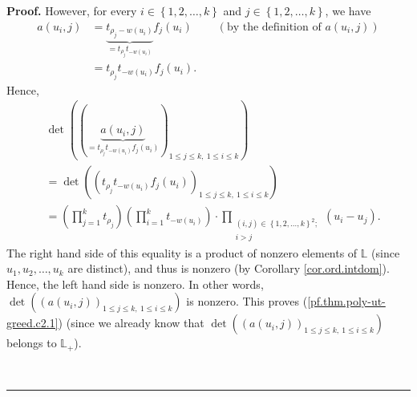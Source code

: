 \documentclass[numbers=enddot,12pt,final,onecolumn,notitlepage]{scrartcl}%
\theoremstyle{definition}
\newenvironment{proof}[1][Proof]{\noindent\textbf{#1.} }{\ \rule{0.5em}{0.5em}}
\let\prodnonlimits\prod
\renewcommand{\prod}{\prodnonlimits\limits}
\renewcommand{\leq}{\leqslant}
\theoremstyle{plainsl}
\begin{document}
\begin{proof}
However, for every $i\in\left\{  1,2,\ldots,k\right\}  $ and $j\in\left\{
1,2,\ldots,k\right\}  $, we have%
\begin{align*}
a\left(  u_{i},j\right)   &  =\underbrace{t_{\rho_{j}-w\left(  u_{i}\right)
}}_{=t_{\rho_{j}}t_{-w\left(  u_{i}\right)  }}f_{j}\left(  u_{i}\right)
\ \ \ \ \ \ \ \ \ \ \left(  \text{by the definition of }a\left(
u_{i},j\right)  \right) \\
&  =t_{\rho_{j}}t_{-w\left(  u_{i}\right)  }f_{j}\left(  u_{i}\right)  .
\end{align*}
Hence,%
\begin{align}
&  \det\left(  \left(  \underbrace{a\left(  u_{i},j\right)  }_{=t_{\rho_{j}%
}t_{-w\left(  u_{i}\right)  }f_{j}\left(  u_{i}\right)  }\right)  _{1\leq
j\leq k,\ 1\leq i\leq k}\right) \nonumber\\
&  =\det\left(  \left(  t_{\rho_{j}}t_{-w\left(  u_{i}\right)  }f_{j}\left(
u_{i}\right)  \right)  _{1\leq j\leq k,\ 1\leq i\leq k}\right) \nonumber\\
&  =\left(  \prod_{j=1}^{k}t_{\rho_{j}}\right)  \left(  \prod_{i=1}%
^{k}t_{-w\left(  u_{i}\right)  }\right)  \cdot\prod_{\substack{\left(
i,j\right)  \in\left\{  1,2,\ldots,k\right\}  ^{2};\\i>j}}\left(  u_{i}%
-u_{j}\right)  . \label{pf.thm.poly-ut-greed.c2.pf.1}%
\end{align}
The right hand side of this equality is a product of nonzero elements of
$\mathbb{L}$ (since $u_{1},u_{2},\ldots,u_{k}$ are distinct), and thus is
nonzero (by Corollary \ref{cor.ord.intdom}). Hence, the left hand side is
nonzero. In other words, $\det\left(  \left(  a\left(  u_{i},j\right)
\right)  _{1\leq j\leq k,\ 1\leq i\leq k}\right)  $ is nonzero. This proves
(\ref{pf.thm.poly-ut-greed.c2.1}) (since we already know that $\det\left(
\left(  a\left(  u_{i},j\right)  \right)  _{1\leq j\leq k,\ 1\leq i\leq
k}\right)  $ belongs to $\mathbb{L}_{+}$).


\end{proof}
\end{document}
